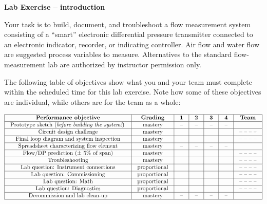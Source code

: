 

\noindent
{\bf Lab Exercise -- introduction}

\vskip 5pt

Your task is to build, document, and troubleshoot a flow measurement system consisting of a ``smart'' electronic differential pressure transmitter connected to an electronic indicator, recorder, or indicating controller.  Air flow and water flow are suggested process variables to measure.  Alternatives to the standard flow-measurement lab are authorized by instructor permission only.

The following table of objectives show what you and your team must complete within the scheduled time for this lab exercise.  Note how some of these objectives are individual, while others are for the team as a whole:



$$\vbox{\offinterlineskip
\halign{\strut
\vrule \quad\hfil # \ \hfil & 
\vrule \quad\hfil # \ \hfil & 
\vrule \quad\hfil # \ \hfil & 
\vrule \quad\hfil # \ \hfil & 
\vrule \quad\hfil # \ \hfil & 
\vrule \quad\hfil # \ \hfil & 
\vrule \quad\hfil # \ \hfil \vrule \cr
\noalign{\hrule}
%
{\bf Performance objective} & {\bf Grading} & {\bf 1} & {\bf 2} & {\bf 3} & {\bf 4} & {\bf Team} \cr
%
\noalign{\hrule}
%
Prototype sketch ({\it before building the system!}) & mastery & -- & -- & -- & -- & \cr
%
\noalign{\hrule}
%
Circuit design challenge & mastery & & & & & -- -- -- -- \cr
%
\noalign{\hrule}
%
Final loop diagram and system inspection & mastery & & & & & -- -- -- -- \cr
%
\noalign{\hrule}
%
Spreadsheet characterizing flow element & mastery & -- & -- & -- & -- &  \cr
%
\noalign{\hrule}
%
Flow/DP prediction ($\pm$ 5\% of span) & mastery & & & & & -- -- -- -- \cr
%
\noalign{\hrule}
%
Troubleshooting & mastery & & & & & -- -- -- -- \cr
%
\noalign{\hrule}
%
Lab question: Instrument connections & proportional &  &  &  &  & -- -- -- -- \cr
%
\noalign{\hrule}
%
Lab question: Commissioning & proportional &  &  &  &  & -- -- -- -- \cr
%
\noalign{\hrule}
%
Lab question: Math & proportional &  &  &  &  & -- -- -- -- \cr
%
\noalign{\hrule}
%
Lab question: Diagnostics & proportional &  &  &  &  & -- -- -- -- \cr
%
\noalign{\hrule}
%
Decommission and lab clean-up & mastery & -- & -- & -- & -- &  \cr
%
\noalign{\hrule}
} %
}$$ %

